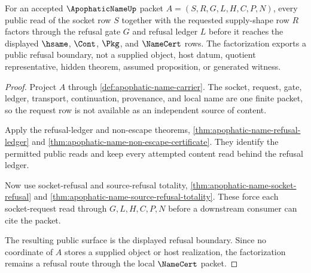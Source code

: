 \begin{theorem}
\label{thm:apophatic-name-socket-request-gate-factorization}
For an accepted $\ApophaticNameUp$ packet $A=(S,R,G,L,H,C,P,N)$, every public read of the socket row $S$ together with the requested supply-shape row $R$ factors through the refusal gate $G$ and refusal ledger $L$ before it reaches the displayed $\hsame$, $\Cont$, $\Pkg$, and $\NameCert$ rows. The factorization exports a public refusal boundary, not a supplied object, host datum, quotient representative, hidden theorem, assumed proposition, or generated witness.
\end{theorem}
\begin{proof}
Project $A$ through \autoref{def:apophatic-name-carrier}. The socket, request, gate, ledger, transport, continuation, provenance, and local name are one finite packet, so the request row is not available as an independent source of content.

Apply the refusal-ledger and non-escape theorems, \autoref{thm:apophatic-name-refusal-ledger} and \autoref{thm:apophatic-name-non-escape-certificate}. They identify the permitted public reads and keep every attempted content read behind the refusal ledger.

Now use socket-refusal and source-refusal totality, \autoref{thm:apophatic-name-socket-refusal} and \autoref{thm:apophatic-name-source-refusal-totality}. These force each socket-request read through $G,L,H,C,P,N$ before a downstream consumer can cite the packet.

The resulting public surface is the displayed refusal boundary. Since no coordinate of $A$ stores a supplied object or host realization, the factorization remains a refusal route through the local $\NameCert$ packet.
\end{proof}

